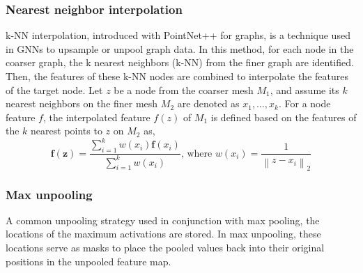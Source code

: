 \subsubsection{Nearest neighbor interpolation} 
k-NN interpolation, introduced with PointNet++ \cite{pnpp} for graphs, is a technique used in GNNs to upsample or unpool graph data. In this method, for each node in the coarser graph, the k nearest neighbors (k-NN) from the finer graph are identified. Then, the features of these k-NN nodes are combined to interpolate the features of the target node. Let \(z\) be a node from the coarser mesh \(M_1\), and assume its \(k\) nearest neighbors on the finer mesh \(M_2\) are denoted as \(x_1, \ldots, x_k\). For a node feature \(f\), the interpolated feature \(f(z)\) of \(M_1\) is defined based on the features of the $k$ nearest points to $z$ on \(M_2\) as,
\begin{equation}
  \mathbf{f}(\mathbf{z})=\frac{\sum_{i=1}^k w\left(x_i\right) \mathbf{f}\left(x_i\right)}{\sum_{i=1}^k w\left(x_i\right)} \text {, where } w\left(x_i\right)=\frac{1}{\left\|z-x_i\right\|_2}
  \end{equation}
\subsubsection{Max unpooling} A common unpooling strategy used in conjunction with max pooling, the locations of the maximum activations are stored. In max unpooling, these locations serve as masks to place the pooled values back into their original positions in the unpooled feature map.
